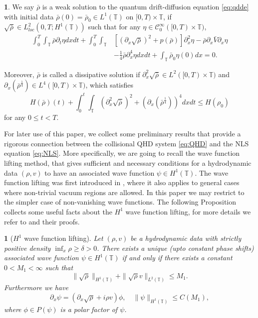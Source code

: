 \documentclass[leqno]{amsart}
\theoremstyle{plain}
\theoremstyle{definition}
\newtheorem{defn}[thm]{\protect\definitionname}
\theoremstyle{remark}
\theoremstyle{plain}
\theoremstyle{plain}
\newtheorem{prop}[thm]{\protect\propositionname}
\providecommand{\definitionname}{Definition}
\providecommand{\propositionname}{Proposition}
\def\T{{\mathbb T}}%
\def\d{{\partial}}
\numberwithin{equation}{section}
\begin{document}
\begin{defn}\label{def:qdde_ws}
We say $\bar\rho$ is a weak solution to the quantum drift-diffusion equation \eqref{eq:qdde} with initial data $\bar\rho(0)=\bar\rho_0\in L^1(\T)$ on $[0,T)\times\T$, if $\sqrt{\bar\rho}\in L^2_{loc}(0,T;H^1(\T))$ such that for any $\eta\in \mathcal{C}_0^\infty([0,T)\times\T)$,
\begin{equation}\label{eq:qdde_cty}
\begin{aligned}
\int_0^T\int_\T\bar\rho\d_t\eta dxdt+\int_0^T\int_\T&[(\d_x\sqrt{\bar\rho})^2+p(\bar\rho)]\d_x^2\eta-\bar\rho\d_x \bar V\d_x\eta\\
&-\frac14\bar\rho\d_x^4\eta dxdt+\int_\T\bar\rho_0\eta(0)dx=0.
\end{aligned}
\end{equation}

Moreover, $\bar\rho$ is called a dissipative solution if $\d_x^2\sqrt{\bar\rho}\in L^2([0,T)\times\T)$ and $\d_x(\bar\rho^\frac14)\in L^4([0,T)\times\T)$, which satisfies
\begin{equation}\label{eq:disp_entrp_1}
H(\bar\rho)(t)+\int_0^t\int_\T(\d_x^2\sqrt{\bar\rho})^2+(\d_x(\bar\rho^\frac14))^4dxdt\leq H(\rho_0)
\end{equation}
for any $0\leq t<T$.
\end{defn}



For later use of this paper, we collect some preliminary results that provide a rigorous connection between the collisional QHD system \eqref{eq:QHD} and the NLS equation \eqref{eq:NLS}. More specifically, we are going to recall the wave function lifting method, that gives sufficient and necessary conditions for a hydrodynamic data $(\rho,v)$ to have an associated wave function $\psi\in H^1(\T)$. 
The wave function lifting was first introduced in \cite{AMZ1,AMZ2}, where it also applies to general cases where non-trivial vacuum regions are allowed. In this paper we may restrict to the simpler case of non-vanishing wave functions.
The following Proposition collects some useful facts about the $H^1$ wave function lifting, for more details we refer to \cite[Proposition 17 and Lemma 19]{AMZ1} and their proofs.

\begin{prop}[$H^1$ wave function lifting]\label{prop:lift1}
Let $(\rho,v)$ be a hydrodynamic data with strictly positive density $\inf_x\rho\geq \delta >0$. There exists a unique (upto constant phase shifts) associated wave function $\psi\in H^1(\T)$ 
if and only if there exists a constant $0<M_1<\infty$ such that 
$$
\|\sqrt{\rho}\|_{H^1(\T)}+\|\sqrt\rho v\|_{L^2(\T)}\leq M_1.
$$ 
Furthermore we have 
\[
\d_x\psi=(\d_x\sqrt\rho+i\rho v)\phi,\quad \|\psi\|_{H^1(\T)}\leq C(M_1),
\]
where $\phi\in P(\psi)$ is a polar factor of $\psi$.
\end{prop}
\end{document}
